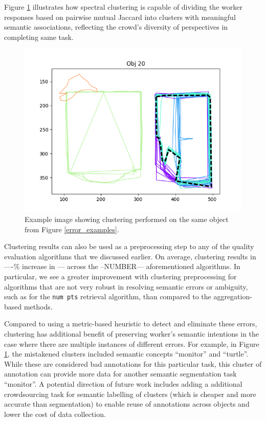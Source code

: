 \par Figure \ref{cluster_example} illustrates how spectral clustering is capable of dividing the worker responses based on pairwise mutual Jaccard into clusters with meaningful semantic associations, reflecting the crowd's diversity of perspectives in completing same task.
    \begin{figure}[ht!]
      \centering
      \includegraphics[width=\textwidth]{plots/20.png}
      \caption{Example image showing clustering performed on the same object from Figure \ref{error_examples}.}
      \label{cluster_example}
    \end{figure}
\par Clustering results can also be used as a preprocessing step to any of the quality evaluation algorithms that we discussed earlier. On average, clustering results in ----\% increase in --- across the --NUMBER--- aforementioned algorithms. In particular, we see a greater improvement with clustering preprocessing for algorithms that are not very robust in resolving semantic errors or ambiguity, such as for the \texttt{num pts} retrieval algorithm, than compared to the aggregation-based methods. 
\par Compared to using a metric-based heuristic to detect and eliminate these errors, clustering has additional benefit of preserving worker's semantic intentions in the case where there are multiple instances of different errors. For example, in Figure \ref{cluster_example}, the mistakened clusters included semantic concepts ``monitor'' and ``turtle''. While these are considered bad annotations for this particular task, this cluster of annotation can provide more data for another semantic segmentation task ``monitor''. A potential direction of future work includes adding a additional crowdsourcing task for semantic labelling of clusters (which is cheaper and more accurate than segmentation) to enable reuse of annotations across objects and lower the cost of data collection. 
